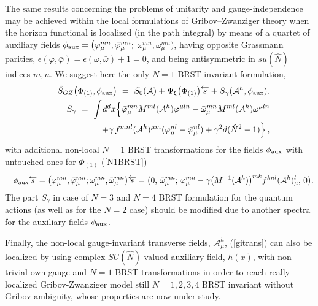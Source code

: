 \documentclass[10pt]{article}
\begin{document}
The same results concerning the problems of unitarity and gauge-independence
may be achieved within the local formulations of Gribov--Zwanziger theory \cite{Zwanziger}
when the horizon functional is localized (in the path integral) by means of a quartet of auxiliary
fields $\phi_{\rm {aux}}=\big(\varphi^{mn}_\mu, \bar{\varphi}{}^{mn}_\mu;$
$\omega^{mn}_\mu, \bar{\omega}{}^{mn}_\mu \big)$, having opposite Grassmann parities,
$\epsilon(\varphi, \bar{\varphi})= \epsilon(\omega, \bar{\omega})+1=0$, and being
antisymmetric in $su(\hat{N})$ indices  $m,n$. We  suggest here the only $N=1$ BRST invariant formulation,
\begin{eqnarray}  \label{Sgamma3}
  && \hat{S}_{GZ}\big({\Phi}_{(1)}, \phi_{\rm {aux}}\big)  \ = \  S_0(\mathcal{A})
+\Psi_{\xi}\big({\Phi}_{(1)}\big) \overleftarrow{s}+  S_{\gamma}(\mathcal{A}^h,\phi_{\rm {aux}}). \\
 && S_{\gamma}\ = \ \int \hspace{-0.1em} d^dx\Big\{{\bar \varphi}^{mn}_\mu M^{ml}(\mathcal{A}^h) \varphi^{\mu{} l n}  - {\bar \omega}^{mn}_\mu  M^{m l}(\mathcal{A}^h) \omega^{\mu{} l n} \nonumber\\
 && \ \  + \gamma\,f^{m nl}(\mathcal{A}^h)^{\mu m}(\varphi_\mu^{nl}-\bar{\varphi}%
_\mu^{nl})+\gamma^2d
(\hat{N}{}^2-1)\Big\}\,, \label{Sgamma1}
\end{eqnarray}
with additional non-local  $N=1$ BRST transformations for the fields $\phi_{\rm {aux}}$ with untouched ones for ${\Phi}_{(1)}$ (\ref{N1BRST})
\begin{eqnarray}\label{N1phi}
&& \phi_{\rm {aux}} \overleftarrow{s} = \big(\varphi^{mn}_\mu, \bar{\varphi}{}^{mn}_\mu;
\omega^{mn}_\mu, \bar{\omega}{}^{mn}_\mu \big) \overleftarrow{s} = \big(0,\,\bar{\omega}^{mn}_\mu  ;\,\varphi^{mn}_\mu -\gamma \big(M^{-1}(\mathcal{A}^h)\big)^{mk}f^{knl} (\mathcal{A}^h)_{\mu}^l  ,\,0\big).
\end{eqnarray}%
The part $S_\gamma$ in case of  $N=3$ and $N=4$ BRST formulation for the quantum actions (as well as for the $N=2$ case) should be modified due to another spectra for the auxiliary fields $\phi_{\rm {aux}}$.

Finally, the non-local gauge-invariant transverse fields, $\mathcal{A}^h_{\mu}$, (\ref{gitrans}) can also be localized by using  complex $SU(\hat{N})$-valued auxiliary field, $h(x)$, with non-trivial own gauge  and $N=1$ BRST transformations   \cite{capri}   in order  to reach really localized Gribov-Zwanziger model still $N=1,2,3,4$ BRST invariant without Gribov ambiguity, whose  properties are now under study.
\end{document}
